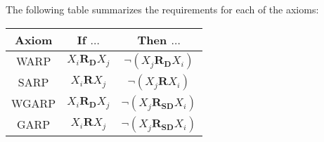 \documentclass{article} %
\begin{document}
The following table summarizes the requirements for each of the axioms:

\renewcommand{\arraystretch}{1.5}
\begin{center}
\begin{tabular}{ c|c|c } 
Axiom & If $\ldots$ & Then $\ldots$ \\\hline
WARP&$X_i \mathbf{R_D} X_j$&$\neg(X_j \mathbf{R_D} X_i)$ \\
SARP&$X_i \mathbf{R} X_j$&$\neg(X_j \mathbf{R} X_i)$ \\
WGARP&$X_i  \mathbf{R_D} X_j$&$\neg(X_j \mathbf{R_{SD}} X_i)$ \\
GARP&$X_i \mathbf{R} X_j$&$\neg(X_j  \mathbf{R_{SD}} X_i)$
\end{tabular}
\end{center}
\renewcommand{\arraystretch}{1}





\end{document}
